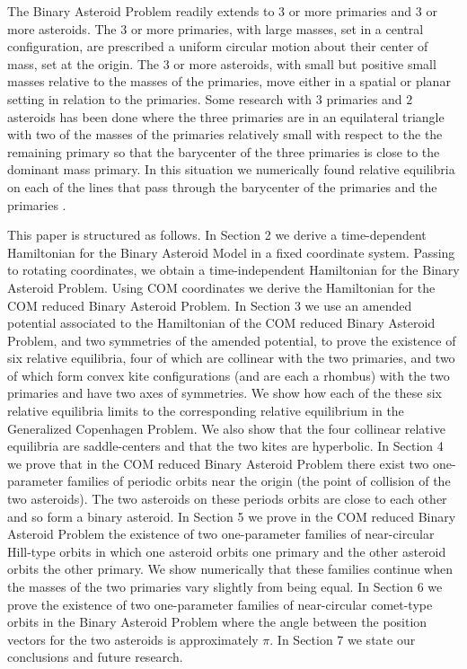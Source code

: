 \documentclass[12pt]{article}
\begin{document}
The Binary Asteroid Problem readily extends to $3$ or more primaries and $3$ or more asteroids. The $3$ or more primaries, with large masses, set in a central configuration, are prescribed a uniform circular motion about their center of mass, set at the origin. The $3$ or more asteroids, with small but positive small masses relative to the masses of the primaries, move either in a spatial or planar setting in relation to the primaries. Some research with $3$ primaries and $2$ asteroids has been done where the three primaries are in an equilateral triangle with two of the masses of the primaries relatively small with respect to the the remaining primary so that the barycenter of the three primaries is close to the dominant mass primary. In this situation we numerically found relative equilibria on each of the lines that pass through the barycenter of the primaries and the primaries \cite{Cochran}.

This paper is structured as follows. In Section 2 we derive a time-dependent Hamiltonian for the Binary Asteroid Model in a fixed coordinate system. Passing to rotating coordinates, we obtain a time-independent Hamiltonian for the Binary Asteroid Problem. Using COM coordinates we derive the Hamiltonian for the COM reduced Binary Asteroid Problem. In Section 3 we use an amended potential associated to the Hamiltonian of the COM reduced Binary Asteroid Problem, and two symmetries of the amended potential, to prove the existence of six relative equilibria, four of which are collinear with the two primaries, and two of which form convex kite configurations (and are each a rhombus) with the two primaries and have two axes of symmetries. We show how each of the these six relative equilibria limits to the corresponding relative equilibrium in the Generalized Copenhagen Problem. We also show that the four collinear relative equilibria are saddle-centers and that the two kites are hyperbolic. In Section 4 we prove that in the COM reduced Binary Asteroid Problem there exist two one-parameter families of periodic orbits near the origin (the point of collision of the two asteroids). The two asteroids on these periods orbits are close to each other and so form a binary asteroid. In Section 5 we prove in the COM reduced Binary Asteroid Problem the existence of two one-parameter families of near-circular Hill-type orbits in which one asteroid orbits one primary and the other asteroid orbits the other primary. We show numerically that these families continue when the masses of the two primaries vary slightly from being equal. In Section 6 we prove the existence of two one-parameter families of near-circular comet-type orbits in the Binary Asteroid Problem where the angle between the position vectors for the two asteroids is approximately $\pi$. In Section 7 we state our conclusions and future research.
\end{document}
